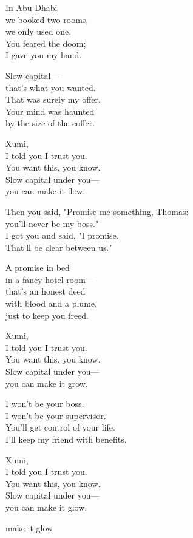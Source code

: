 \begin{lyrics}
In Abu Dhabi\\
we booked two rooms,\\
we only used one.\\
You feared the doom;\\
I gave you my hand.

Slow capital—\\
that's what you wanted.\\
That was surely my offer.\\
Your mind was haunted\\
by the size of the coffer.

Xumi,\\
I told you I trust you.\\
You want this, you know.\\
Slow capital under you—\\
you can make it flow.

Then you said,
"Promise me something, Thomas:\\
you'll never be my boss."\\
I got you and said, "I promise.\\
That'll be clear between us."

A promise in bed\\
in a fancy hotel room—\\
that's an honest deed\\
with blood and a plume,\\
just to keep you freed.

Xumi,\\
I told you I trust you.\\
You want this, you know.\\
Slow capital under you—\\
you can make it grow.

I won't be your boss.\\
I won't be your supervisor.\\
You'll get control of your life.\\
I'll keep my friend with benefits.

Xumi,\\
I told you I trust you.\\
You want this, you know.\\
Slow capital under you—\\
you can make it glow.

make it glow
\end{lyrics}

